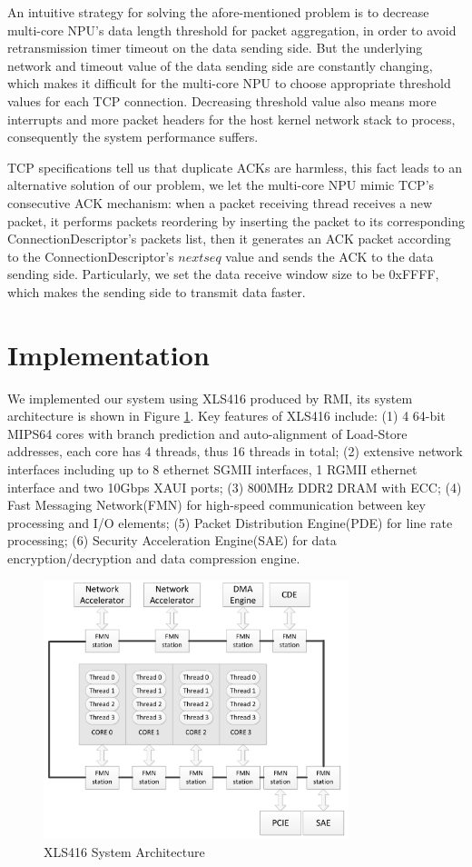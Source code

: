 \documentclass[conference]{IEEEtran}
\begin{document}
 An intuitive strategy for solving the afore-mentioned problem is to decrease multi-core NPU's data length threshold for packet aggregation, in order to avoid retransmission timer timeout on the data sending side. But the underlying network and timeout value of the data sending side are constantly changing, which makes it difficult for the multi-core NPU to choose appropriate threshold values for each TCP connection. Decreasing threshold value also means more interrupts and more packet headers for the host kernel network stack to process, consequently the system performance suffers.

 TCP specifications tell us that duplicate ACKs are harmless, this fact leads to an alternative solution of our problem, we let the multi-core NPU mimic TCP's consecutive ACK mechanism: when a packet receiving thread receives a new packet, it performs packets reordering by inserting the packet to its corresponding ConnectionDescriptor's packets list, then it generates an ACK packet according to the ConnectionDescriptor's $nextseq$ value and sends the ACK to the data sending side. Particularly, we set the data receive window size to be 0xFFFF, which makes the sending side to transmit data faster.
\section{Implementation}
We implemented our system using XLS416 produced by RMI, its system architecture is shown in Figure \ref{xls416}. Key features of XLS416 include: (1) 4 64-bit MIPS64 cores with branch prediction and auto-alignment of Load-Store addresses, each core has 4 threads, thus 16 threads in total; (2) extensive network interfaces including up to 8 ethernet SGMII interfaces, 1 RGMII ethernet interface and two 10Gbps XAUI ports; (3) 800MHz DDR2 DRAM with ECC; (4) Fast Messaging Network(FMN) for high-speed communication between key processing and I/O elements; (5) Packet Distribution Engine(PDE) for line rate processing; (6) Security Acceleration Engine(SAE) for data encryption/decryption and data compression engine.
\begin{figure}[!t]
\centering
\includegraphics[width=3.5in]{xls416}
\caption{XLS416 System Architecture}
\label{xls416}
\end{figure}
\end{document}
